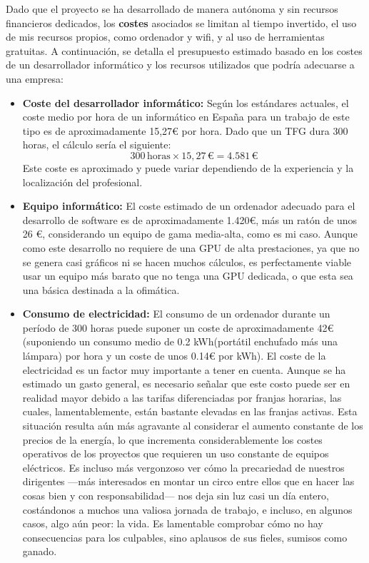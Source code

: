 Dado que el proyecto se ha desarrollado de manera autónoma y sin recursos financieros dedicados, los \textbf{costes} asociados se limitan al tiempo invertido, el uso de mis recursos propios, como ordenador y wifi, y al uso de herramientas gratuitas. A continuación, se detalla el presupuesto estimado basado en los costes de un desarrollador informático y los recursos utilizados que podría adecuarse a una empresa:

\begin{itemize}
    \item \textbf{Coste del desarrollador informático:} Según los estándares actuales, el coste medio por hora de un informático en España para un trabajo de este tipo es de aproximadamente 15,27€ por hora\cite{sueldo}. Dado que un TFG dura 300 horas, el cálculo sería el siguiente:
    \[
    300 \, \text{horas} \times 15,27 \, \text{€} = 4.581 \, \text{€}
    \]
    Este coste es aproximado y puede variar dependiendo de la experiencia y la localización del profesional.

    \item \textbf{Equipo informático:} El coste estimado de un ordenador adecuado para el desarrollo de software es de aproximadamente 1.420€, más un ratón de unos 26 €, considerando un equipo de gama media-alta, como es mi caso. Aunque como este desarrollo no requiere de una GPU de alta prestaciones, ya que no se genera casi gráficos ni se hacen muchos cálculos, es perfectamente viable usar un equipo más barato que no tenga una GPU dedicada, o que esta sea una básica destinada a la ofimática.

    \item \textbf{Consumo de electricidad:} El consumo de un ordenador durante un período de 300 horas puede suponer un coste de aproximadamente 42€ (suponiendo un consumo medio de 0.2 kWh(portátil enchufado más una lámpara) por hora\cite{luz} y un coste de unos 0.14€ por kWh). El coste de la electricidad es un factor muy importante a tener en cuenta. Aunque se ha estimado un gasto general, es necesario señalar que este costo puede ser en realidad mayor debido a las tarifas diferenciadas por franjas horarias, las cuales, lamentablemente, están bastante elevadas en las franjas activas. Esta situación resulta aún más agravante al considerar el aumento constante de los precios de la energía, lo que incrementa considerablemente los costes operativos de los proyectos que requieren un uso constante de equipos eléctricos. Es incluso más vergonzoso ver cómo la precariedad de nuestros dirigentes —más interesados en montar un circo entre ellos que en hacer las cosas bien y con responsabilidad— nos deja sin luz casi un día entero, costándonos a muchos una valiosa jornada de trabajo, e incluso, en algunos casos, algo aún peor: la vida. Es lamentable comprobar cómo no hay consecuencias para los culpables, sino aplausos de sus fieles, sumisos como ganado.



\end{itemize}
